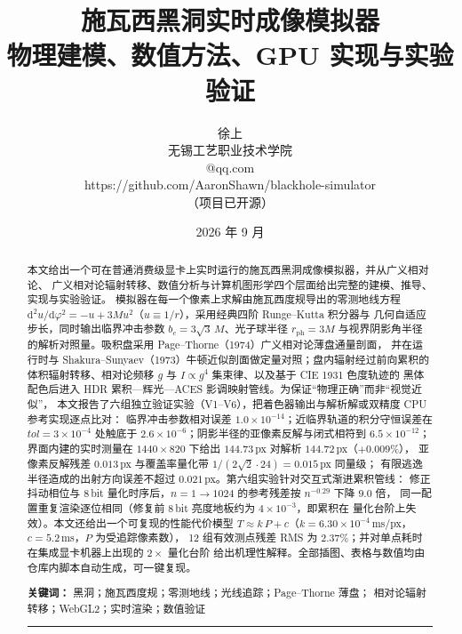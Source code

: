 \documentclass[11pt,a4paper,fontset=windows]{ctexart}
\title{\bfseries 施瓦西黑洞实时成像模拟器\\[6pt]
\large 物理建模、数值方法、GPU 实现与实验验证}
\author{徐上\\[3pt]
\normalsize 无锡工艺职业技术学院\\[3pt]
\small\ttfamily 3473945423@qq.com \quad 15366192183\\[3pt]
\small\ttfamily https://github.com/AaronShawn/blackhole-simulator\\[1pt]
\small（项目已开源）}
\date{2026 年 9 月}
\newcommand{\M}{M}
\newcommand{\dd}{\mathrm{d}}
\newcommand{\bph}{r_{\mathrm{ph}}}
\newcommand{\bc}{b_{c}}
\theoremstyle{plain}
\theoremstyle{definition}
\begin{document}
\maketitle

\begin{abstract}
\noindent
本文给出一个可在普通消费级显卡上实时运行的施瓦西黑洞成像模拟器，并从广义相对论、
广义相对论辐射转移、数值分析与计算机图形学四个层面给出完整的建模、推导、实现与实验验证。
模拟器在每一个像素上求解由施瓦西度规导出的零测地线方程
$\dd^2u/\dd\varphi^2=-u+3\M u^2$（$u\equiv1/r$），采用经典四阶 Runge--Kutta 积分器与
几何自适应步长，同时输出临界冲击参数 $\bc=3\sqrt3\,\M$、光子球半径 $\bph=3\M$
与视界阴影角半径的解析对照量。吸积盘采用 Page--Thorne（1974）广义相对论薄盘通量剖面，
并在运行时与 Shakura--Sunyaev（1973）牛顿近似剖面做定量对照；盘内辐射经过前向累积的
体积辐射转移、相对论频移 $g$ 与 $I\propto g^{4}$ 集束律、以及基于 CIE 1931 色度轨迹的
黑体配色后进入 HDR 累积—辉光—ACES 影调映射管线。为保证“物理正确”而非“视觉近似”，
本文报告了六组独立验证实验（V1--V6），把着色器输出与解析解或双精度 CPU 参考实现逐点比对：
临界冲击参数相对误差 $1.0\times10^{-14}$；近临界轨道的积分守恒误差在 $tol=3\times10^{-4}$
处触底于 $2.6\times10^{-6}$；阴影半径的亚像素反解与闭式相符到 $6.5\times10^{-12}$；
界面内建的实时测量在 $1440\times820$ 下给出 $144.73$\,px 对解析 $144.72$\,px（$+0.009\%$），
亚像素反解残差 $0.013$\,px 与覆盖率量化带 $1/(2\sqrt2\cdot24)=0.015$\,px 同量级；
有限逃逸半径造成的出射方向误差不超过 $0.021$\,px。第六组实验针对交互式渐进累积管线：
修正抖动相位与 8\,bit 量化时序后，$n=1\to1024$ 的参考残差按 $n^{-0.29}$ 下降 $9.0$ 倍，
同一配置重复渲染逐位相同（修复前 8\,bit 亮度地板约为 $4\times10^{-3}$，即累积在
量化台阶上失效）。本文还给出一个可复现的性能代价模型
$T \approx k\,P + c$（$k=6.30\times10^{-4}$\,ms/px，$c=5.2$\,ms，$P$ 为受追踪像素数），
12 组有效测点残差 RMS 为 $2.37\%$；并对单点耗时在集成显卡机器上出现的 $2\times$ 量化台阶
给出机理性解释。全部插图、表格与数值均由仓库内脚本自动生成，可一键复现。

\vspace{6pt}
\noindent\textbf{关键词：} 黑洞；施瓦西度规；零测地线；光线追踪；Page--Thorne 薄盘；
相对论辐射转移；WebGL2；实时渲染；数值验证

\vspace{10pt}
\begin{center}\rule{0.85\linewidth}{0.4pt}\end{center}
\vspace{4pt}


\end{abstract}
\end{document}
